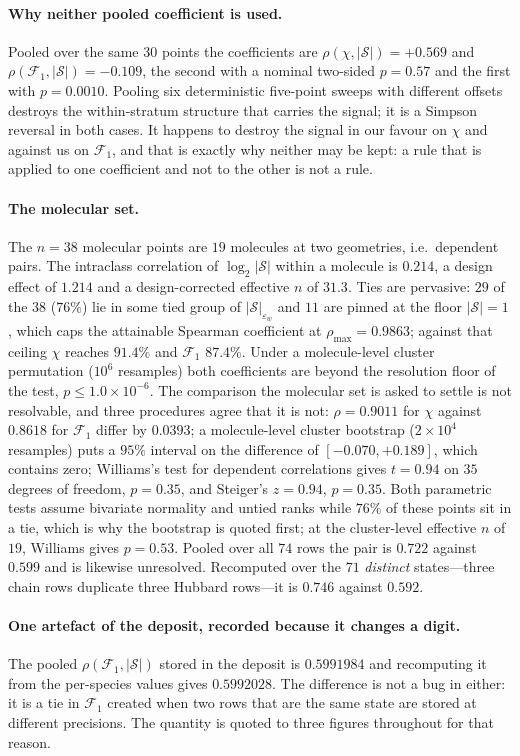 \paragraph{Why neither pooled coefficient is used.} Pooled over the same $30$ points
the coefficients are $\rho(\chi,|\mathcal S|)=+0.569$ and
$\rho(\mathcal F_1,|\mathcal S|)=-0.109$, the second with a nominal two-sided $p=0.57$ and the first
with $p=0.0010$. Pooling six deterministic five-point sweeps with different offsets destroys the
within-stratum structure that carries the signal; it is a Simpson reversal in both cases. It happens to
destroy the signal in our favour on $\chi$ and against us on $\mathcal F_1$, and that is exactly why
neither may be kept: a rule that is applied to one coefficient and not to the other is not a rule.

\paragraph{The molecular set.} The $n=38$ molecular points are $19$ molecules at two geometries, i.e.\
dependent pairs. The intraclass correlation of $\log_2|\mathcal S|$ within a molecule is $0.214$, a
design effect of $1.214$ and a design-corrected effective $n$ of $31.3$. Ties are pervasive: $29$ of
the $38$ ($76\%$) lie in some tied group of $|\mathcal S|_{\varepsilon_w}$ and $11$ are pinned at the
floor $|\mathcal S|=1$, which caps the attainable Spearman coefficient at $\rho_{\max}=0.9863$;
against that ceiling $\chi$ reaches $91.4\%$ and $\mathcal F_1$ $87.4\%$. Under a molecule-level
cluster permutation ($10^{6}$ resamples) both coefficients are beyond the resolution floor of the
test, $p\le1.0\times10^{-6}$. The comparison the molecular set is asked to settle is not resolvable,
and three
procedures agree that it is not: $\rho=0.9011$ for $\chi$ against $0.8618$ for $\mathcal F_1$ differ by
$0.0393$; a molecule-level cluster bootstrap ($2\times10^{4}$ resamples) puts a $95\%$ interval on the
difference of $[-0.070,+0.189]$, which contains zero; Williams's test for dependent correlations gives
$t=0.94$ on $35$ degrees of freedom, $p=0.35$, and Steiger's $z=0.94$, $p=0.35$. Both parametric tests
assume bivariate normality and untied ranks while $76\%$ of these points sit in a tie, which is why the
bootstrap is quoted first; at the cluster-level effective $n$ of $19$, Williams gives $p=0.53$. Pooled
over all $74$ rows the pair is $0.722$ against $0.599$ and is likewise unresolved. Recomputed over the
$71$ \emph{distinct} states---three chain rows duplicate three Hubbard rows---it is $0.746$ against
$0.592$.

\paragraph{One artefact of the deposit, recorded because it changes a digit.} The pooled
$\rho(\mathcal F_1,|\mathcal S|)$ stored in the deposit is $0.5991984$ and recomputing it from the
per-species values gives $0.5992028$. The difference is not a bug in either: it is a tie in
$\mathcal F_1$ created when two rows that are the same state are stored at different precisions. The
quantity is quoted to three figures throughout for that reason.
